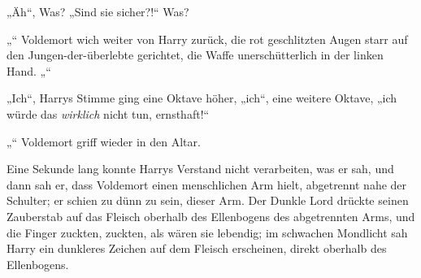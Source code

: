 „Äh“, Was?
„Sind sie sicher?!“ Was?

„“
Voldemort wich weiter von Harry zurück, die rot geschlitzten Augen starr auf den Jungen-der-überlebte gerichtet, die Waffe unerschütterlich in der linken Hand.
„“

„Ich“, Harrys Stimme ging eine Oktave höher,
„ich“, eine weitere Oktave, „ich würde das \emph{wirklich} nicht tun, ernsthaft!“

„“
Voldemort griff wieder in den Altar.

Eine Sekunde lang konnte Harrys Verstand nicht verarbeiten, was er sah, und dann sah er, dass Voldemort einen menschlichen Arm hielt, abgetrennt nahe der Schulter; er schien zu dünn zu sein, dieser Arm.
Der Dunkle Lord drückte seinen Zauberstab auf das Fleisch oberhalb des Ellenbogens des abgetrennten Arms, und die Finger zuckten, zuckten, als wären sie lebendig; im schwachen Mondlicht sah Harry ein dunkleres Zeichen auf dem Fleisch erscheinen, direkt oberhalb des Ellenbogens.

